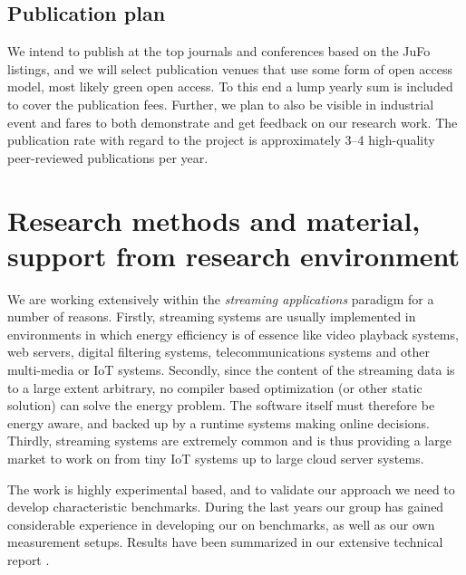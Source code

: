 \documentclass{article}
\begin{document}
\subsection{Publication plan}
We intend to publish at the top journals and conferences based on the JuFo listings, and we will select publication venues that use some form of open access model, most likely green open access. 
To this end a lump yearly sum is included to cover the publication fees. 
Further, we plan to also be visible in industrial event and fares to both demonstrate and get feedback on our research work.
The publication rate with regard to the project is approximately 3--4 high-quality peer-reviewed publications per year.

\section{Research methods and material, support from research environment}

We are working extensively within the \textit{streaming applications} paradigm for a number of reasons. 
Firstly, streaming systems are usually implemented in environments in which energy efficiency is of essence like video playback systems, web servers, digital filtering systems, telecommunications systems and other multi-media or IoT systems. 
Secondly, since the content of the streaming data is to a large extent arbitrary, no compiler based optimization (or other static solution) can solve the energy problem. 
The software itself must therefore be energy aware, and backed up by a runtime systems making online decisions. 
Thirdly, streaming systems are extremely common and is thus providing a large market to work on from tiny IoT systems up to large cloud server systems.\smallskip

The work is highly experimental based, and to validate our approach we need to develop characteristic benchmarks. 
During the last years our group has gained considerable experience in developing our on benchmarks, as well as our own measurement setups. 
Results have been summarized in our extensive technical report \cite{HolmbackaTechrep}. 
\end{document}
